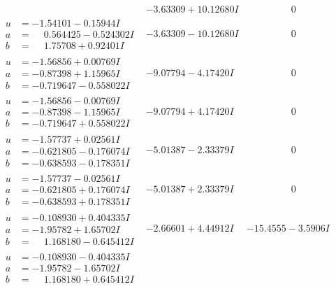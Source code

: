 \documentclass[1p]{elsarticle_modified}
\theoremstyle{definition}
\begin{document}
$$\begin{array}{c|c|c}
 & -3.63309 + 10.12680 I & \phantom{-0.000000 } 0 \\ \hline\begin{aligned}
u &= -1.54101 - 0.15944 I \\
a &= \phantom{-}0.564425 - 0.524302 I \\
b &= \phantom{-}1.75708 + 0.92401 I\end{aligned}
 & -3.63309 - 10.12680 I & \phantom{-0.000000 } 0 \\ \hline\begin{aligned}
u &= -1.56856 + 0.00769 I \\
a &= -0.87398 + 1.15965 I \\
b &= -0.719647 - 0.558022 I\end{aligned}
 & -9.07794 - 4.17420 I & \phantom{-0.000000 } 0 \\ \hline\begin{aligned}
u &= -1.56856 - 0.00769 I \\
a &= -0.87398 - 1.15965 I \\
b &= -0.719647 + 0.558022 I\end{aligned}
 & -9.07794 + 4.17420 I & \phantom{-0.000000 } 0 \\ \hline\begin{aligned}
u &= -1.57737 + 0.02561 I \\
a &= -0.621805 - 0.176074 I \\
b &= -0.638593 - 0.178351 I\end{aligned}
 & -5.01387 - 2.33379 I & \phantom{-0.000000 } 0 \\ \hline\begin{aligned}
u &= -1.57737 - 0.02561 I \\
a &= -0.621805 + 0.176074 I \\
b &= -0.638593 + 0.178351 I\end{aligned}
 & -5.01387 + 2.33379 I & \phantom{-0.000000 } 0 \\ \hline\begin{aligned}
u &= -0.108930 + 0.404335 I \\
a &= -1.95782 + 1.65702 I \\
b &= \phantom{-}1.168180 - 0.645412 I\end{aligned}
 & -2.66601 + 4.44912 I & -15.4555 - 3.5906 I \\ \hline\begin{aligned}
u &= -0.108930 - 0.404335 I \\
a &= -1.95782 - 1.65702 I \\
b &= \phantom{-}1.168180 + 0.645412 I\end{aligned}

\end{array}$$
\end{document}
